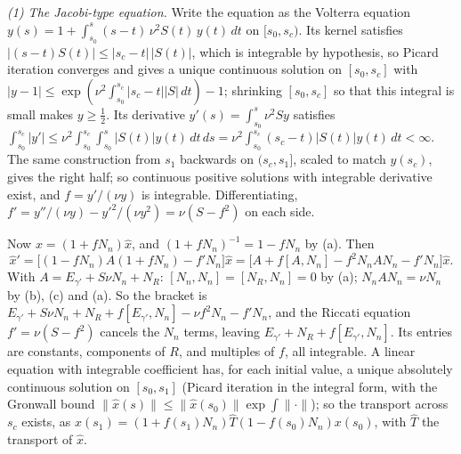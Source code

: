 \emph{(1) The Jacobi-type equation.} Write the equation as the Volterra equation $y(s) = 1 + \int_{s_0}^{s} (s - t)\,\nu^2 S(t)\,y(t)\,dt$ on $[s_0, s_c)$. Its kernel satisfies $|(s - t) S(t)| \le |s_c - t|\,|S(t)|$, which is integrable by hypothesis, so Picard iteration converges and gives a unique continuous solution on $[s_0, s_c]$ with $|y - 1| \le \exp(\nu^2 \int_{s_0}^{s_c}|s_c - t||S|\,dt) - 1$; shrinking $[s_0, s_c]$ so that this integral is small makes $y \ge \tfrac12$. Its derivative $y'(s) = \int_{s_0}^{s}\nu^2 S y$ satisfies $\int_{s_0}^{s_c}|y'| \le \nu^2 \int_{s_0}^{s_c}\int_{s_0}^{s}|S(t)| y(t)\,dt\,ds = \nu^2\int_{s_0}^{s_c}(s_c - t)|S(t)|y(t)\,dt < \infty$. The same construction from $s_1$ backwards on $(s_c, s_1]$, scaled to match $y(s_c)$, gives the right half; so continuous positive solutions with integrable derivative exist, and $f = y'/(\nu y)$ is integrable. Differentiating, $f' = y''/(\nu y) - y'^2/(\nu y^2) = \nu(S - f^2)$ on each side.

Now $x = (1 + fN_n)\hat x$, and $(1 + fN_n)^{-1} = 1 - fN_n$ by (a). Then
\[
\hat x' = \bigl[(1 - fN_n)A(1 + fN_n) - f' N_n\bigr]\hat x
= \bigl[A + f[A, N_n] - f^2 N_n A N_n - f' N_n\bigr]\hat x .
\]
With $A = E_{\gamma'} + S\nu N_n + N_R$: $[N_n, N_n] = [N_R, N_n] = 0$ by (a); $N_n A N_n = \nu N_n$ by (b), (c) and (a). So the bracket is $E_{\gamma'} + S\nu N_n + N_R + f[E_{\gamma'}, N_n] - \nu f^2 N_n - f' N_n$, and the Riccati equation $f' = \nu(S - f^2)$ cancels the $N_n$ terms, leaving $E_{\gamma'} + N_R + f[E_{\gamma'}, N_n]$. Its entries are constants, components of $R$, and multiples of $f$, all integrable. A linear equation with integrable coefficient has, for each initial value, a unique absolutely continuous solution on $[s_0, s_1]$ (Picard iteration in the integral form, with the Gronwall bound $\|\hat x(s)\| \le \|\hat x(s_0)\|\exp\int\|\cdot\|$); so the transport across $s_c$ exists, as $x(s_1) = (1 + f(s_1)N_n)\hat T (1 - f(s_0)N_n)x(s_0)$, with $\hat T$ the transport of $\hat x$.

